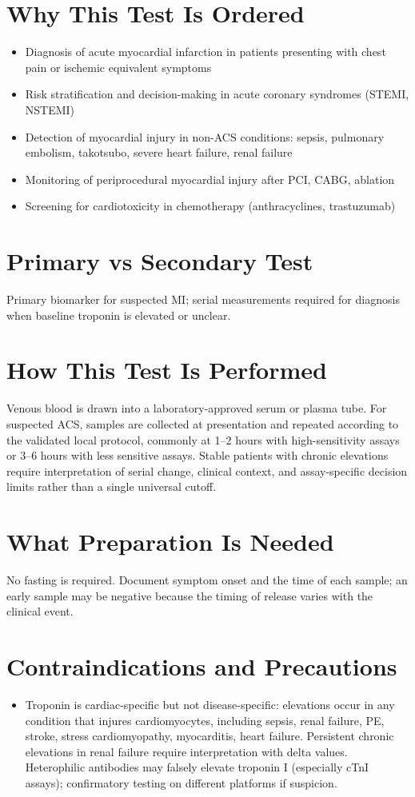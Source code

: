\section*{Why This Test Is Ordered}
\begin{itemize}
  \item Diagnosis of acute myocardial infarction in patients presenting with chest pain or ischemic equivalent symptoms
  \item Risk stratification and decision-making in acute coronary syndromes (STEMI, NSTEMI)
  \item Detection of myocardial injury in non-ACS conditions: sepsis, pulmonary embolism, takotsubo, severe heart failure, renal failure
  \item Monitoring of periprocedural myocardial injury after PCI, CABG, ablation
  \item Screening for cardiotoxicity in chemotherapy (anthracyclines, trastuzumab)
\end{itemize}

\section*{Primary vs Secondary Test}
Primary biomarker for suspected MI; serial measurements required for diagnosis when baseline troponin is elevated or unclear.

\section*{How This Test Is Performed}
Venous blood is drawn into a laboratory-approved serum or plasma tube. For suspected ACS, samples are collected at presentation and repeated according to the validated local protocol, commonly at 1--2 hours with high-sensitivity assays or 3--6 hours with less sensitive assays. Stable patients with chronic elevations require interpretation of serial change, clinical context, and assay-specific decision limits rather than a single universal cutoff.

\section*{What Preparation Is Needed}
No fasting is required. Document symptom onset and the time of each sample; an early sample may be negative because the timing of release varies with the clinical event.

\section*{Contraindications and Precautions}
\begin{itemize}
  \item Troponin is cardiac-specific but not disease-specific: elevations occur in any condition that injures cardiomyocytes, including sepsis, renal failure, PE, stroke, stress cardiomyopathy, myocarditis, heart failure. Persistent chronic elevations in renal failure require interpretation with delta values. Heterophilic antibodies may falsely elevate troponin I (especially cTnI assays); confirmatory testing on different platforms if suspicion.
\end{itemize}
